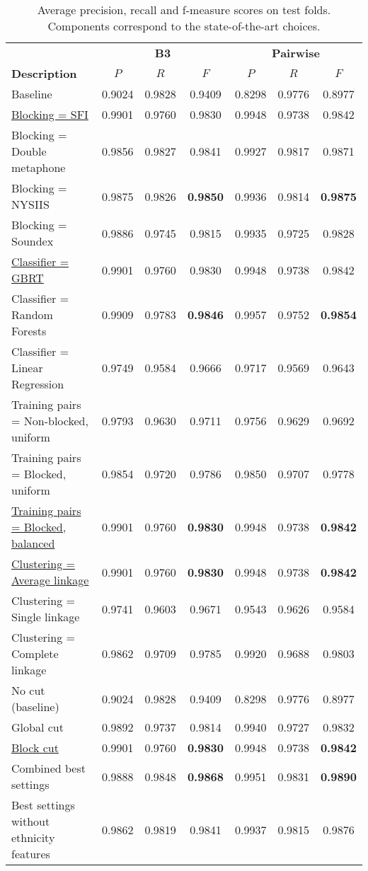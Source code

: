 \documentclass[runningheads,a4paper]{llncs}
\begin{document}
\begin{small}
\begin{table*}
\caption{Average precision, recall and f-measure scores on test folds. Components correspond to the state-of-the-art choices.}
\label{table:results}
\centering
\begin{tabular}{|l|c c c | c c c|}
  \hline
                       & \multicolumn{3}{|c|}{\textbf{B3}} & \multicolumn{3}{|c|}{\textbf{Pairwise}}\\
  \textbf{Description} & $P$ & $R$ & $F$ & $P$ & $R$ & $F$ \\
  \hline
  \hline
Baseline & 0.9024 & 0.9828 & 0.9409  & 0.8298 & 0.9776 & 0.8977 \\
\hline
\underline{Blocking = SFI} & 0.9901 & 0.9760 & 0.9830  & 0.9948 & 0.9738 & 0.9842\\
Blocking = Double metaphone & 0.9856 & 0.9827 & 0.9841  & 0.9927 & 0.9817 & 0.9871 \\
Blocking = NYSIIS & 0.9875 & 0.9826 & \textbf{0.9850}  & 0.9936 & 0.9814 & \textbf{0.9875} \\
Blocking = Soundex & 0.9886 & 0.9745 & 0.9815 & 0.9935 & 0.9725 & 0.9828 \\
\hline
\underline{Classifier = GBRT} & 0.9901 & 0.9760 & 0.9830   & 0.9948 & 0.9738 & 0.9842 \\
Classifier = Random Forests & 0.9909 & 0.9783 & \textbf{0.9846}  & 0.9957 & 0.9752 & \textbf{0.9854} \\
Classifier = Linear Regression & 0.9749 & 0.9584 & 0.9666 & 0.9717 & 0.9569 & 0.9643 \\
\hline
Training pairs = Non-blocked, uniform & 0.9793 & 0.9630 & 0.9711  & 0.9756 & 0.9629 & 0.9692 \\
Training pairs = Blocked, uniform & 0.9854 & 0.9720 & 0.9786  & 0.9850 & 0.9707 & 0.9778 \\
\underline{Training pairs = Blocked, balanced} & 0.9901 & 0.9760 & \textbf{0.9830}  & 0.9948 & 0.9738 & \textbf{0.9842} \\
\hline
\underline{Clustering = Average linkage} & 0.9901 & 0.9760 & \textbf{0.9830}  & 0.9948 & 0.9738 & \textbf{0.9842} \\
Clustering = Single linkage & 0.9741 & 0.9603 & 0.9671  & 0.9543 & 0.9626 & 0.9584 \\
Clustering = Complete linkage & 0.9862 & 0.9709 & 0.9785  & 0.9920 & 0.9688 & 0.9803 \\
\hline
No cut (baseline) & 0.9024 & 0.9828 & 0.9409  & 0.8298 & 0.9776 & 0.8977 \\
Global cut & 0.9892 & 0.9737 & 0.9814  & 0.9940 & 0.9727 & 0.9832 \\
\underline{Block cut} & 0.9901 & 0.9760 & \textbf{0.9830}  & 0.9948 & 0.9738 & \textbf{0.9842} \\
\hline
Combined best settings & 0.9888 & 0.9848 & \textbf{0.9868}  & 0.9951 & 0.9831 & \textbf{0.9890} \\
Best settings without ethnicity features & 0.9862 & 0.9819 & 0.9841 & 0.9937 & 0.9815 & 0.9876 \\
  \hline
\end{tabular}
\end{table*}
\end{small}
\end{document}
